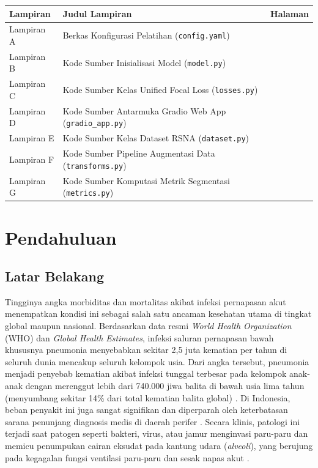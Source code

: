 \documentclass[12pt,a4paper,oneside]{book}
\begin{document}
\noindent
\begin{tabular}{p{2.5cm} p{10.5cm} r}
  \textbf{Lampiran} & \textbf{Judul Lampiran} & \textbf{Halaman} \\
  \midrule
  Lampiran A & Berkas Konfigurasi Pelatihan (\texttt{config.yaml}) & \pageref{app:config_file} \\
  Lampiran B & Kode Sumber Inisialisasi Model (\texttt{model.py}) & \pageref{app:model_code} \\
  Lampiran C & Kode Sumber Kelas Unified Focal Loss (\texttt{losses.py}) & \pageref{app:losses_code} \\
  Lampiran D & Kode Sumber Antarmuka Gradio Web App (\texttt{gradio\_app.py}) & \pageref{app:gradio_ui} \\
  Lampiran E & Kode Sumber Kelas Dataset RSNA (\texttt{dataset.py}) & \pageref{app:dataset_code} \\
  Lampiran F & Kode Sumber Pipeline Augmentasi Data (\texttt{transforms.py}) & \pageref{app:transforms_code} \\
  Lampiran G & Kode Sumber Komputasi Metrik Segmentasi (\texttt{metrics.py}) & \pageref{app:metrics_code} \\
\end{tabular}

\mainmatter
{}
\pagestyle{body}

\chapter[PENDAHULUAN]{Pendahuluan}

\section{Latar Belakang}

Tingginya angka morbiditas dan mortalitas akibat infeksi pernapasan akut menempatkan kondisi ini sebagai salah satu ancaman kesehatan utama di tingkat global maupun nasional. Berdasarkan data resmi \textit{World Health Organization} (WHO) dan \textit{Global Health Estimates}, infeksi saluran pernapasan bawah khususnya pneumonia menyebabkan sekitar 2,5 juta kematian per tahun di seluruh dunia mencakup seluruh kelompok usia. Dari angka tersebut, pneumonia menjadi penyebab kematian akibat infeksi tunggal terbesar pada kelompok anak-anak dengan merenggut lebih dari 740.000 jiwa balita di bawah usia lima tahun (menyumbang sekitar 14\% dari total kematian balita global) \parencite{who2024}. Di Indonesia, beban penyakit ini juga sangat signifikan dan diperparah oleh keterbatasan sarana penunjang diagnosis medis di daerah perifer \parencite{said2018}. Secara klinis, patologi ini terjadi saat patogen seperti bakteri, virus, atau jamur menginvasi paru-paru dan memicu penumpukan cairan eksudat pada kantung udara (\textit{alveoli}), yang berujung pada kegagalan fungsi ventilasi paru-paru dan sesak napas akut \parencite{seth2022}.
\end{document}
